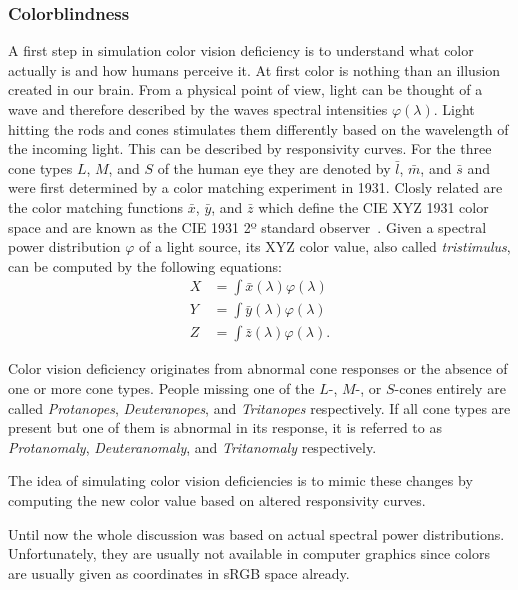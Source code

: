 \documentclass{sig-alternate-05-2015}
\begin{document}
\subsubsection{Colorblindness}
\label{sec:colorblindness}
A first step in simulation color vision deficiency is to understand what color actually is and how humans perceive it.
At first color is nothing than an illusion created in our brain.
From a physical point of view, light can be thought of a wave and therefore described by the waves spectral intensities $\varphi(\lambda)$.
Light hitting the rods and cones stimulates them differently based on the wavelength of the incoming light.
This can be described by responsivity curves.
For the three cone types $L$, $M$, and $S$ of the human eye they are denoted by $\bar l$, $\bar m$, and $\bar s$ and were first determined by a color matching experiment in 1931.
Closly related are the color matching functions $\bar x$, $\bar y$, and $\bar z$ which define the CIE XYZ 1931 color space and are known as the CIE 1931 2º standard observer~\cite{cvrl-xyz-web}.
Given a spectral power distribution $\varphi$ of a light source, its XYZ color value, also called \emph{tristimulus}, can be computed by the following equations:
\begin{eqnarray}
    \label{eqn:xyzdef}
    X &= \int\bar x(\lambda) \varphi(\lambda) \\
    Y &= \int\bar y(\lambda) \varphi(\lambda) \\
    Z &= \int\bar z(\lambda) \varphi(\lambda).
\end{eqnarray}

Color vision deficiency originates from abnormal cone responses or the absence of one or more cone types.
People missing one of the $L$-, $M$-, or $S$-cones entirely are called \emph{Protanopes}, \emph{Deuteranopes}, and \emph{Tritanopes} respectively.
If all cone types are present but one of them is abnormal in its response, it is referred to as \emph{Protanomaly}, \emph{Deuteranomaly}, and \emph{Tritanomaly} respectively.

The idea of simulating color vision deficiencies is to mimic these changes by computing the new color value based on altered responsivity curves.

Until now the whole discussion was based on actual spectral power distributions.
Unfortunately, they are usually not available in computer graphics since colors are usually given as coordinates in sRGB space already.
\end{document}
